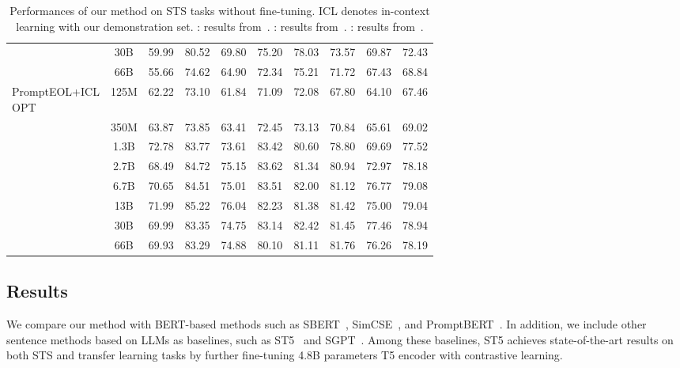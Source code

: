 \documentclass{article}
\begin{document}
\begin{table*}[t]
{\begin{tabular}{lccccccccc}
& 30B &  59.99 & 80.52 & 69.80 & 75.20 & 78.03 & 73.57 & 69.87 & 72.43\\
& 66B &  55.66 & 74.62 & 64.90 & 72.34 & 75.21 & 71.72 & 67.43 & 68.84 \\
\midrule
\multirowcell{8}[0pt][l]{PromptEOL+ICL\\OPT}
 &  125M& 62.22 & 73.10 & 61.84 & 71.09 & 72.08 & 67.80 & 64.10 & 67.46 \\
 &  350M& 63.87 & 73.85 & 63.41 & 72.45 & 73.13 & 70.84 & 65.61 & 69.02 \\
 &  1.3B& 72.78 & 83.77 & 73.61 & 83.42 & 80.60 & 78.80 & 69.69 & 77.52 \\
 &  2.7B& 68.49 & 84.72 & 75.15 & 83.62 & 81.34 & 80.94 & 72.97 & 78.18 \\
 &  6.7B\cellcolor{lightcyan}& 70.65\cellcolor{lightcyan} & 84.51\cellcolor{lightcyan} & 75.01\cellcolor{lightcyan} & 83.51\cellcolor{lightcyan} & 82.00\cellcolor{lightcyan} & 81.12\cellcolor{lightcyan} & 76.77\cellcolor{lightcyan} & 79.08\cellcolor{lightcyan} \\
 &  13B & 71.99 & 85.22 & 76.04 & 82.23 & 81.38 & 81.42 & 75.00 & 79.04 \\
 &  30B & 69.99 & 83.35 & 74.75 & 83.14 & 82.42 & 81.45 & 77.46 & 78.94 \\
 &  66B & 69.93 & 83.29 & 74.88 & 80.10 & 81.11 & 81.76 & 76.26 & 78.19 \\

\bottomrule
\end{tabular}
}
\caption{ Performances of our method on STS tasks without fine-tuning. ICL denotes in-context learning with our demonstration set.
: results from~\cite{gao2021simcse}.
  : results from~\cite{jiang2022promptbert}.
  : results from~\cite{sentencet5}.
}\label{tab:sts_wo_ft}
\vspace{-10pt}
\end{table*}

\subsection{Results}
We compare our method with BERT-based methods such as SBERT~\cite{reimers2019sentence}, SimCSE~\cite{gao2021simcse}, and PromptBERT~\cite{jiang2022promptbert}. In addition, we include other sentence methods based on LLMs as baselines, such as ST5~\cite{sentencet5} and SGPT~\cite{muennighoff2022sgpt}.
Among these baselines, ST5 achieves state-of-the-art results on both STS and transfer learning tasks by further fine-tuning 4.8B parameters T5 encoder  with contrastive learning.
\end{document}
